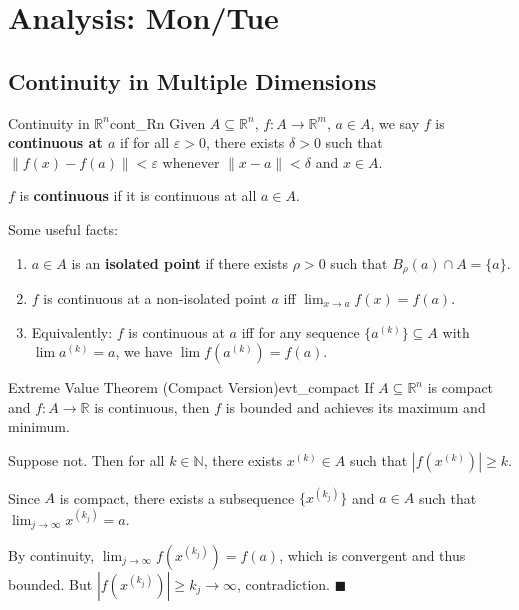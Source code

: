 \documentclass[11pt, letterpaper, openany]{book}
\renewenvironment{proof}[1][\proofname]{%
  \tcolorbox[blanker, breakable, left=1em,
    before skip=1em, after skip=1em,
    borderline west={2pt}{0pt}{MagicTeal!50},
    colback=MagicCream,
    before upper={\textcolor{MagicTeal}{\sffamily\bfseries #1.}\space}
  ]%
}{%
  \hfill\textcolor{MagicTeal}{\ensuremath{\blacksquare}}\endtcolorbox%
}
\begin{document}
\section{Analysis: Mon/Tue}

\subsection{Continuity in Multiple Dimensions}

\begin{defn}{Continuity in $\mathbb{R}^n$}{cont_Rn}
Given $A \subseteq \mathbb{R}^n$, $f: A \to \mathbb{R}^m$, $a \in A$, we say $f$ is \textbf{continuous at $a$} if for all $\varepsilon > 0$, there exists $\delta > 0$ such that $\|f(x) - f(a)\| < \varepsilon$ whenever $\|x - a\| < \delta$ and $x \in A$.

$f$ is \textbf{continuous} if it is continuous at all $a \in A$.
\end{defn}

\begin{remark}
Some useful facts:
\begin{enumerate}
    \item $a \in A$ is an \textbf{isolated point} if there exists $\rho > 0$ such that $B_\rho(a) \cap A = \{a\}$.
    \item $f$ is continuous at a non-isolated point $a$ iff $\lim_{x \to a} f(x) = f(a)$.
    \item Equivalently: $f$ is continuous at $a$ iff for any sequence $\{a^{(k)}\} \subseteq A$ with $\lim a^{(k)} = a$, we have $\lim f(a^{(k)}) = f(a)$.
\end{enumerate}
\end{remark}

\begin{thm}{Extreme Value Theorem (Compact Version)}{evt_compact}
If $A \subseteq \mathbb{R}^n$ is compact and $f: A \to \mathbb{R}$ is continuous, then $f$ is bounded and achieves its maximum and minimum.
\end{thm}

\begin{proof}
Suppose not. Then for all $k \in \mathbb{N}$, there exists $x^{(k)} \in A$ such that $|f(x^{(k)})| \geq k$.

Since $A$ is compact, there exists a subsequence $\{x^{(k_j)}\}$ and $a \in A$ such that $\lim_{j\to\infty} x^{(k_j)} = a$.

By continuity, $\lim_{j\to\infty} f(x^{(k_j)}) = f(a)$, which is convergent and thus bounded. But $|f(x^{(k_j)})| \geq k_j \to \infty$, contradiction.
\end{proof}
\end{document}

